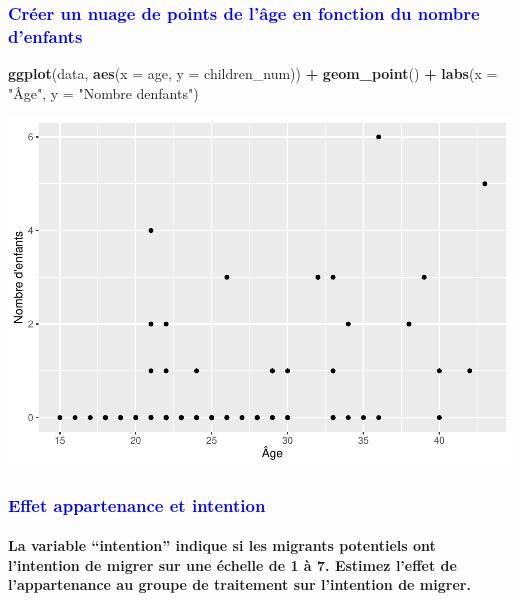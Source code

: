 \documentclass[
]{article}
\newenvironment{Shaded}{\begin{snugshade}}{\end{snugshade}}
\newcommand{\AttributeTok}[1]{\textcolor[rgb]{0.13,0.29,0.53}{#1}}
\newcommand{\FunctionTok}[1]{\textcolor[rgb]{0.13,0.29,0.53}{\textbf{#1}}}
\newcommand{\NormalTok}[1]{#1}
\newcommand{\SpecialCharTok}[1]{\textcolor[rgb]{0.81,0.36,0.00}{\textbf{#1}}}
\newcommand{\StringTok}[1]{\textcolor[rgb]{0.31,0.60,0.02}{#1}}
\begin{document}
\hfill\break

\textcolor{blue}{\subsubsection{Créer un nuage de points de l'âge en fonction du nombre d'enfants}}

\hfill\break

\begin{Shaded}
\begin{Highlighting}[]
\FunctionTok{ggplot}\NormalTok{(data, }\FunctionTok{aes}\NormalTok{(}\AttributeTok{x =}\NormalTok{ age, }\AttributeTok{y =}\NormalTok{ children\_num)) }\SpecialCharTok{+}
  \FunctionTok{geom\_point}\NormalTok{() }\SpecialCharTok{+}
  \FunctionTok{labs}\NormalTok{(}\AttributeTok{x =} \StringTok{"Âge"}\NormalTok{, }\AttributeTok{y =} \StringTok{"Nombre d\textquotesingle{}enfants"}\NormalTok{)}
\end{Highlighting}
\end{Shaded}

\includegraphics{Projet_R_ISE_1_files/figure-latex/unnamed-chunk-55-1.pdf}\\

\textcolor{blue}{\subsubsection{Effet appartenance et intention}}

\hfill\break

\hypertarget{la-variable-intention-indique-si-les-migrants-potentiels-ont-lintention-de-migrer-sur-une-uxe9chelle-de-1-uxe0-7.-estimez-leffet-de-lappartenance-au-groupe-de-traitement-sur-lintention-de-migrer.}{%
\paragraph{La variable ``intention'' indique si les migrants potentiels
ont l'intention de migrer sur une échelle de 1 à 7. Estimez l'effet de
l'appartenance au groupe de traitement sur l'intention de
migrer.}\label{la-variable-intention-indique-si-les-migrants-potentiels-ont-lintention-de-migrer-sur-une-uxe9chelle-de-1-uxe0-7.-estimez-leffet-de-lappartenance-au-groupe-de-traitement-sur-lintention-de-migrer.}}
\end{document}
